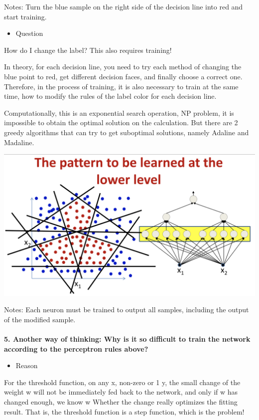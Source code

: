 \documentclass{article}
\begin{document}
	Notes: Turn the blue sample on the right side of the decision line into red and start training.
	
	\begin{itemize}
		\item Question
	\end{itemize}
	
	How do I change the label? This also requires training!
	
	In theory, for each decision line, you need to try each method of changing the blue point to red, get different decision faces, and finally choose a correct one. Therefore, in the process of training, it is also necessary to train at the same time, how to modify the rules of the label color for each decision line.
	
	Computationally, this is an exponential search operation, NP problem, it is impossible to obtain the optimal solution on the calculation. But there are 2 greedy algorithms that can try to get suboptimal solutions, namely Adaline and Madaline.
	
	\includegraphics[scale=0.2]{53.png}
	
	Notes: Each neuron must be trained to output all samples, including the output of the modified sample. \\ \\
	
	\textbf{5. Another way of thinking: Why is it so difficult to train the network according to the perceptron rules above?}
	
	\begin{itemize}
		\item Reason
	\end{itemize}
	
	For the threshold function, on any x, non-zero or 1 y, the small change of the weight w will not be immediately fed back to the network, and only if w has changed enough, we know w Whether the change really optimizes the fitting result. That is, the threshold function is a step function, which is the problem!
	
\end{document}
